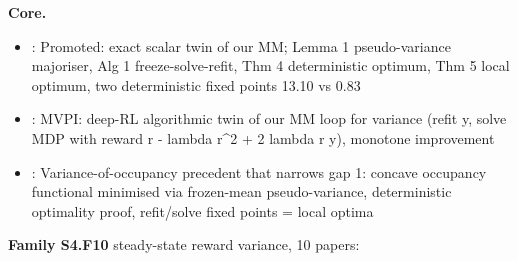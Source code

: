 \documentclass[10pt]{article}
\newcommand{\memb}[1]{\par\smallskip\textbf{#1}\quad}
\begin{document}
\memb{Core.}
\begin{itemize}[nosep,leftmargin=1.2em]
\item \citet{Xia-optimization16}: Promoted: exact scalar twin of our MM; Lemma 1 pseudo-variance majoriser, Alg 1 freeze-solve-refit, Thm 4 deterministic optimum, Thm 5 local optimum, two deterministic fixed points 13.10 vs 0.83
\item \citet{Zhang-meanvariance21}: MVPI: deep-RL algorithmic twin of our MM loop for variance (refit y, solve MDP with reward r - lambda r\^{}2 + 2 lambda r y), monotone improvement
\item \citet{Xia-global26}: Variance-of-occupancy precedent that narrows gap 1: concave occupancy functional minimised via frozen-mean pseudo-variance, deterministic optimality proof, refit/solve fixed points = local optima
\end{itemize}
\memb{Family S4.F10} steady-state reward variance, 10 papers: {\footnotesize \citetext{\citealp{Xia-optimization16}; \citealp{Zhang-meanvariance21}; \citealp{Xia-global26}; \citealp{Kawai-variance87}; \citealp{Huang-finding94}; \citealp{Prashanth-varianceconstrained16}; \citealp{Bisi-riskaverse20}; \citealp{Chung-meanvariance94}; \citealp{Guo-notes02}; \citealp{Xia-variance17}}}
\end{document}
